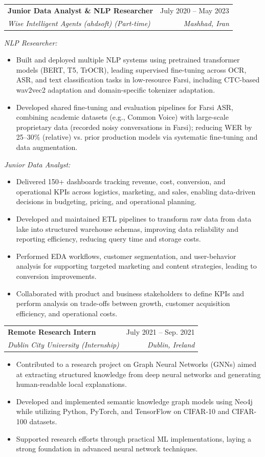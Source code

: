 \documentclass[11pt,a4paper]{article}
\makeatletter
\newcommand{\entry}[4]{%
  \noindent\begin{tabular*}{\textwidth}{@{}l@{\extracolsep{\fill}}r@{}}
    \textbf{#1} & #2 \\
    \textit{#3} & \textit{#4} \\
  \end{tabular*}\vspace{2pt}}
\makeatother
\begin{document}
\entry{Junior Data Analyst \& NLP Researcher}{July 2020 -- May 2023}
      {Wise Intelligent Agents (ahdsoft) (Part-time)}{Mashhad, Iran}
\textit{NLP Researcher:}
\begin{itemize}
  \item Built and deployed multiple NLP systems using pretrained transformer
        models (BERT, T5, TrOCR), leading supervised fine-tuning across OCR,
        ASR, and text classification tasks in low-resource Farsi, including
        CTC-based wav2vec2 adaptation and domain-specific tokenizer adaptation.
  \item Developed shared fine-tuning and evaluation pipelines for Farsi ASR,
        combining academic datasets (e.g., Common Voice) with large-scale
        proprietary data (recorded noisy conversations in Farsi); reducing WER by
        25--30\% (relative) vs. prior production models via systematic
        fine-tuning and data augmentation.
\end{itemize}
\textit{Junior Data Analyst:}
\begin{itemize}
  \item Delivered 150+ dashboards tracking revenue, cost, conversion, and
        operational KPIs across logistics, marketing, and sales, enabling
        data-driven decisions in budgeting, pricing, and operational planning.
  \item Developed and maintained ETL pipelines to transform raw data from data
        lake into structured warehouse schemas, improving data reliability and
        reporting efficiency, reducing query time and storage costs.
  \item Performed EDA workflows, customer segmentation, and user-behavior
        analysis for supporting targeted marketing and content strategies,
        leading to conversion improvements.
  \item Collaborated with product and business stakeholders to define KPIs and
        perform analysis on trade-offs between growth, customer acquisition
        efficiency, and operational costs.
\end{itemize}
\vspace{5pt}

\entry{Remote Research Intern}{July 2021 -- Sep. 2021}
      {Dublin City University (Internship)}{Dublin, Ireland}
\begin{itemize}
  \item Contributed to a research project on Graph Neural Networks (GNNs) aimed
        at extracting structured knowledge from deep neural networks and
        generating human-readable local explanations.
  \item Developed and implemented semantic knowledge graph models using Neo4j
        while utilizing Python, PyTorch, and TensorFlow on CIFAR-10 and
        CIFAR-100 datasets.
  \item Supported research efforts through practical ML implementations, laying a
        strong foundation in advanced neural network techniques.
\end{itemize}
\end{document}
